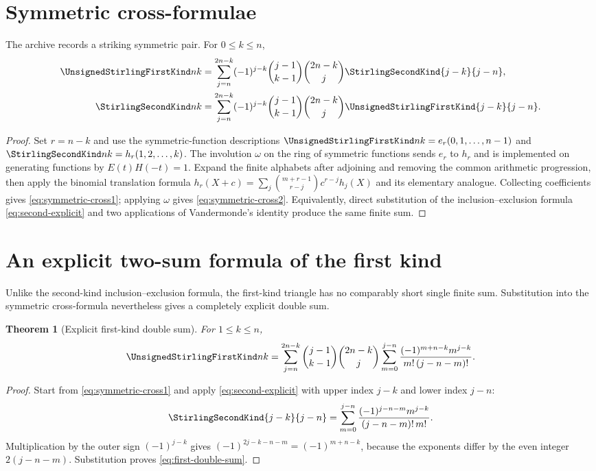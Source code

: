 \documentclass[11pt,a4paper,oneside,openany]{book}
\newtheorem{theorem}{Theorem}[chapter]
\theoremstyle{definition}
\theoremstyle{remark}
\begin{document}
\section{Symmetric cross-formulae}
The archive records a striking symmetric pair.  For $0\le k\le n$,
\begin{align}
 \UnsignedStirlingFirstKind nk
 &=\sum_{j=n}^{2n-k}(-1)^{j-k}\binom{j-1}{k-1}\binom{2n-k}{j}
      \StirlingSecondKind{j-k}{j-n},\label{eq:symmetric-cross1}\\
 \StirlingSecondKind nk
 &=\sum_{j=n}^{2n-k}(-1)^{j-k}\binom{j-1}{k-1}\binom{2n-k}{j}
      \UnsignedStirlingFirstKind{j-k}{j-n}.\label{eq:symmetric-cross2}
\end{align}
\begin{proof}
Set $r=n-k$ and use the symmetric-function descriptions
$\UnsignedStirlingFirstKind nk=e_r(0,1,\ldots,n-1)$ and
$\StirlingSecondKind nk=h_r(1,2,\ldots,k)$.  The involution $\omega$ on the ring of symmetric
functions sends $e_r$ to $h_r$ and is implemented on generating functions by
$E(t)H(-t)=1$.  Expand the finite alphabets after adjoining and removing the common
arithmetic progression, then apply the binomial translation formula
$h_r(X+c)=\sum_j\binom{m+r-1}{r-j}c^{r-j}h_j(X)$ and its elementary analogue.
Collecting coefficients gives \cref{eq:symmetric-cross1}; applying $\omega$ gives
\cref{eq:symmetric-cross2}.  Equivalently, direct substitution of the
inclusion--exclusion formula \cref{eq:second-explicit} and two applications of
Vandermonde's identity produce the same finite sum.
\end{proof}


\section{An explicit two-sum formula of the first kind}
Unlike the second-kind inclusion--exclusion formula, the first-kind triangle has no
comparably short single finite sum.  Substitution into the symmetric cross-formula
nevertheless gives a completely explicit double sum.

\begin{theorem}[Explicit first-kind double sum]
\label{thm:first-double-sum}
For $1\le k\le n$,
\begin{equation}
\label{eq:first-double-sum}
 \UnsignedStirlingFirstKind nk
 =\sum_{j=n}^{2n-k}\binom{j-1}{k-1}\binom{2n-k}{j}
   \sum_{m=0}^{j-n}
   \frac{(-1)^{m+n-k}m^{j-k}}{m!\,(j-n-m)!}.
\end{equation}
\end{theorem}
\begin{proof}
Start from \eqref{eq:symmetric-cross1} and apply
\eqref{eq:second-explicit} with upper index $j-k$ and lower index $j-n$:
\[
 \StirlingSecondKind{j-k}{j-n}
 =\sum_{m=0}^{j-n}
   \frac{(-1)^{j-n-m}m^{j-k}}{(j-n-m)!\,m!}.
\]
Multiplication by the outer sign $(-1)^{j-k}$ gives
$(-1)^{2j-k-n-m}=(-1)^{m+n-k}$, because the exponents differ by the even integer
$2(j-n-m)$.  Substitution proves \eqref{eq:first-double-sum}.
\end{proof}
\end{document}
